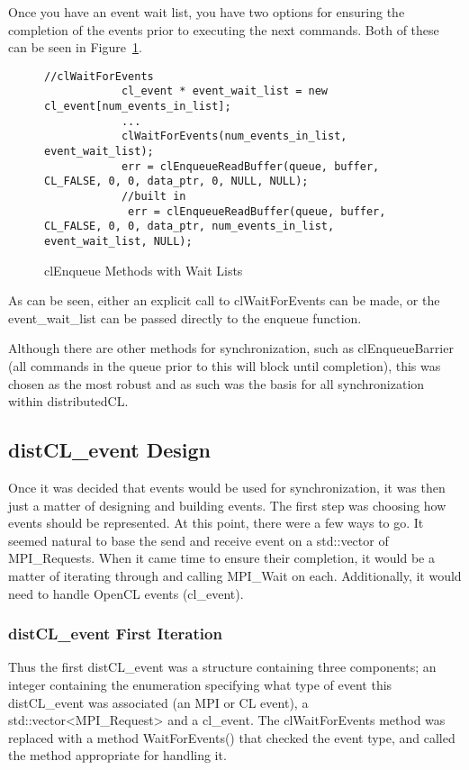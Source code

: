 \documentclass[report.tex]{subfiles}
\begin{document}
        Once you have an event wait list, you have two options for ensuring the completion of the events prior to executing the next commands. Both of these can be seen in Figure~\ref{fig:cl_enqueue_wait_list}.

        \begin{figure}[htbp]
            \centering
            \lstset{language=cpp}  
            \begin{lstlisting}[tabsize=2]
            //clWaitForEvents
            cl_event * event_wait_list = new cl_event[num_events_in_list];
            ...
            clWaitForEvents(num_events_in_list, event_wait_list);
            err = clEnqueueReadBuffer(queue, buffer, CL_FALSE, 0, 0, data_ptr, 0, NULL, NULL);
            //built in
             err = clEnqueueReadBuffer(queue, buffer, CL_FALSE, 0, 0, data_ptr, num_events_in_list, event_wait_list, NULL);
            \end{lstlisting}
            \caption{clEnqueue Methods with Wait Lists}
            \label{fig:cl_enqueue_wait_list}
        \end{figure}

        As can be seen, either an explicit call to clWaitForEvents can be made, or the event\_wait\_list can be passed directly to the enqueue function.

        Although there are other methods for synchronization, such as clEnqueueBarrier (all commands in the queue prior to this will block until completion), this was chosen as the most robust and as such was the basis for all synchronization within distributedCL.

    \subsection{distCL\_event Design} %
    \label{sub:distcl_event_design}
        Once it was decided that events would be used for synchronization, it was then just a matter of designing and building events. The first step was choosing how events should be represented. At this point, there were a few ways to go. It seemed natural to base the send and receive event on a std::vector of MPI\_Requests. When it came time to ensure their completion, it would be a matter of iterating through and calling MPI\_Wait on each. Additionally, it would need to handle OpenCL events (cl\_event). 
        \subsubsection{distCL\_event First Iteration} %
        \label{ssub:distcl_event_first_iteration}
            Thus the first distCL\_event was a structure containing three components; an integer containing the enumeration specifying what type of event this distCL\_event was associated (an MPI or CL event), a std::vector<MPI\_Request> and a cl\_event. The clWaitForEvents method was replaced with a method WaitForEvents() that checked the event type, and called the method appropriate for handling it.
\end{document}

